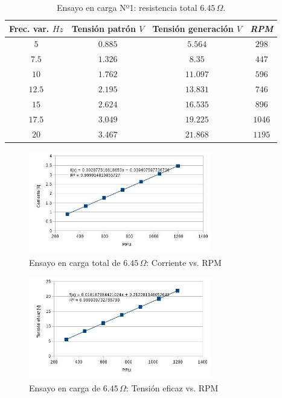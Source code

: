 \documentclass[a4paper,11pt,twoside]{IT-CNEA}
\begin{document}
\begin{table}[h!]
\centering
\caption{Ensayo en carga Nº1: resistencia total $6.45\,\varOmega$.}
\label{tabla:carga645}
\begin{tabular}{|c|c|c|c|}
\hline
Frec. var. $Hz$ & Tensión patrón $V$ & Tensión generación $V$  & \textit{RPM}\\ \hline

$5$&$0.885$&$5.564$&$298$ \\ \hline
$7.5$&$1.326$&$8.35$&$447$ \\ \hline
$10$&$1.762$&$11.097$&$596$ \\ \hline
$12.5$&$2.195$&$13.831$&$746$ \\ \hline
$15$&$2.624$&$16.535$&$896$ \\ \hline
$17.5$&$3.049$&$19.225$&$1046$ \\ \hline
$20$&$3.467$&$21.868$&$1195$ \\ \hline

\end{tabular}
\end{table}
\begin{figure}[h!]
\centering
\includegraphics[width=8cm]{Figuras/CargaCorriente645.jpg}
\caption{Ensayo en carga total de $6.45\,\varOmega$: Corriente vs. RPM}
\label{fig:CargaCorriente645}
\end{figure}
\begin{figure}[h!]
\centering
\includegraphics[width=8cm]{Figuras/CargaTension645.jpg}
\caption{Ensayo en carga de $6.45\,\varOmega$: Tensión eficaz vs. RPM}
\label{fig:CargaTension645}
\end{figure}
\end{document}

